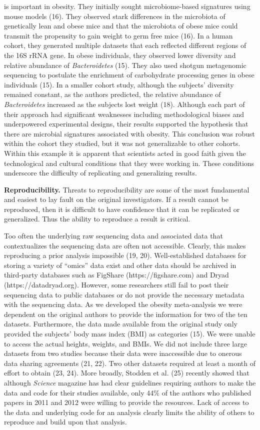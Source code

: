 \documentclass[]{article}
\begin{document}
is important in obesity. They initially sought microbiome-based
signatures using mouse models (16). They observed stark differences in
the microbiota of genetically lean and obese mice and that the
microbiota of obese mice could transmit the propensity to gain weight to
germ free mice (16). In a human cohort, they generated multiple datasets
that each reflected different regions of the 16S rRNA gene. In obese
individuals, they observed lower diversity and relative abundance of
\emph{Bacteroidetes} (15). They also used shotgun metagenomic sequencing
to postulate the enrichment of carbohydrate processing genes in obese
individuals (15). In a smaller cohort study, although the subjects'
diversity remained constant, as the authors predicted, the relative
abundance of \emph{Bacteroidetes} increased as the subjects lost weight
(18). Although each part of their approach had significant weaknesses
including methodological biases and underpowered experimental designs,
their results supported the hypothesis that there are microbial
signatures associated with obesity. This conclusion was robust within
the cohort they studied, but it was not generalizable to other cohorts.
Within this example it is apparent that scientists acted in good faith
given the technological and cultural conditions that they were working
in. These conditions underscore the difficulty of replicating and
generalizing results.

\textbf{Reproducibility.} Threats to reproducibility are some of the
most fundamental and easiest to lay fault on the original investigators.
If a result cannot be reproduced, then it is difficult to have
confidence that it can be replicated or generalized. Thus the ability to
reproduce a result is critical.

Too often the underlying raw sequencing data and associated data that
contextualizes the sequencing data are often not accessible. Clearly,
this makes reproducing a prior analysis impossible (19, 20).
Well-established databases for storing a variety of ``omics'' data exist
and other data should be archived in third-party databases such as
FigShare (https://figshare.com) and Dryad (https://datadryad.org).
However, some researchers still fail to post their sequencing data to
public databases or do not provide the necessary metadata with the
sequencing data. As we developed the obesity meta-analysis we were
dependent on the original authors to provide the information for two of
the ten datasets. Furthermore, the data made available from the original
study only provided the subjects' body mass index (BMI) as categories
(15). We were unable to access the actual heights, weights, and BMIs. We
did not include three large datasets from two studies because their data
were inaccessible due to onerous data sharing agreements (21, 22). Two
other datasets required at least a month of effort to obtain (23, 24).
More broadly, Stodden et al. (25) recently showed that although
\emph{Science} magazine has had clear guidelines requiring authors to
make the data and code for their studies available, only 44\% of the
authors who published papers in 2011 and 2012 were willing to provide
the resources. Lack of access to the data and underlying code for an
analysis clearly limits the ability of others to reproduce and build
upon that analysis.
\end{document}
